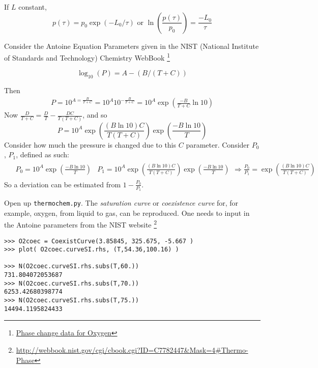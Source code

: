 \documentclass[10pt]{amsart}
\begin{document}
\begin{multicols*}{2}
If $L$ constant, 
\begin{equation}
p(\tau) = p_0 \exp{ (-L_0 /\tau)} \text{ or } \ln{ \left( \frac{p(\tau)}{p_0} \right) } = \frac{-L_0}{\tau}
\end{equation}

Consider the Antoine Equation Parameters given in the NIST (National Institute of Standards and Technology) Chemistry WebBook \footnote{\href{http://webbook.nist.gov/cgi/cbook.cgi?ID=C7782447&Mask=4\#Thermo-Phase}{Phase change data for Oxygen}}

\begin{equation}
  \log_{10}(P) = A- (B/(T+C))
\end{equation}

Then
\[
\begin{gathered}
  P = 10^{ A = \frac{B}{T+C}} = 10^A 10^{-\frac{B}{T+C}} = 10^A \exp{ \left( \frac{-B}{T+C} \ln{10} \right) }
\end{gathered}
\]
Now $\frac{D}{T+C} = \frac{D}{T} - \frac{DC}{T(T+C)}$, and so
\[
P = 10^A \exp{ \left( \frac{ (B\ln{10} )C }{T(T+C)} \right) }\exp{ \left( \frac{-B\ln{10} }{ T} \right) }
\]
Consider how much the pressure is changed due to this $C$ parameter.  Consider $P_0$, $P_1$, defined as such:
\[
\begin{gathered}
  \begin{aligned}
    & P_0 = 10^A  \exp{ \left( \frac{-B\ln{10} }{ T} \right) }
    & P_1 = 10^A \exp{ \left( \frac{ (B\ln{10} )C }{T(T+C)} \right) }\exp{ \left( \frac{-B\ln{10} }{ T} \right) }
  \end{aligned} \Longrightarrow \frac{P_0}{P_1} = \exp{ \left( \frac{ (B\ln{10} )C }{ T(T+C) } \right)}
\end{gathered}
\]
So a deviation can be estimated from $1 - \frac{P_0}{P_1}$.  

Open up \verb|thermochem.py|.  The \emph{saturation curve} or \emph{coexistence curve} for, for example, oxygen, from liquid to gas, can be reproduced.  One needs to input in the Antoine parameters from the NIST website \footnote{\url{http://webbook.nist.gov/cgi/cbook.cgi?ID=C7782447&Mask=4\#Thermo-Phase}}

\begin{lstlisting}
>>> O2coec = CoexistCurve(3.85845, 325.675, -5.667 )                                            
>>> plot( O2coec.curveSI.rhs, (T,54.36,100.16) )   

>>> N(O2coec.curveSI.rhs.subs(T,60.))
731.804072053687
>>> N(O2coec.curveSI.rhs.subs(T,70.))
6253.42680398774
>>> N(O2coec.curveSI.rhs.subs(T,75.))
14494.1195824433
\end{lstlisting}


\end{multicols*}
\end{document}
